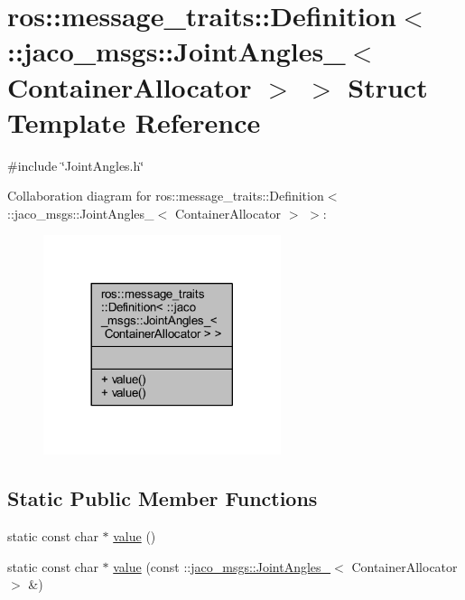 \hypertarget{structros_1_1message__traits_1_1Definition_3_01_1_1jaco__msgs_1_1JointAngles___3_01ContainerAllocator_01_4_01_4}{}\section{ros\+:\+:message\+\_\+traits\+:\+:Definition$<$ \+:\+:jaco\+\_\+msgs\+:\+:Joint\+Angles\+\_\+$<$ Container\+Allocator $>$ $>$ Struct Template Reference}
\label{structros_1_1message__traits_1_1Definition_3_01_1_1jaco__msgs_1_1JointAngles___3_01ContainerAllocator_01_4_01_4}


{\ttfamily \#include \char`\"{}Joint\+Angles.\+h\char`\"{}}



Collaboration diagram for ros\+:\+:message\+\_\+traits\+:\+:Definition$<$ \+:\+:jaco\+\_\+msgs\+:\+:Joint\+Angles\+\_\+$<$ Container\+Allocator $>$ $>$\+:
\nopagebreak
\begin{figure}[H]
\begin{center}
\leavevmode
\includegraphics[width=197pt]{d4/dd9/structros_1_1message__traits_1_1Definition_3_01_1_1jaco__msgs_1_1JointAngles___3_01ContainerAllocator_01_4_01_4__coll__graph}
\end{center}
\end{figure}
\subsection*{Static Public Member Functions}
\begin{DoxyCompactItemize}
\item 
static const char $\ast$ \hyperlink{structros_1_1message__traits_1_1Definition_3_01_1_1jaco__msgs_1_1JointAngles___3_01ContainerAllocator_01_4_01_4_ad1e421bdb7010be769409124216a760d}{value} ()
\item 
static const char $\ast$ \hyperlink{structros_1_1message__traits_1_1Definition_3_01_1_1jaco__msgs_1_1JointAngles___3_01ContainerAllocator_01_4_01_4_a367a6254ee6673cb082dbe3070536d04}{value} (const \+::\hyperlink{structjaco__msgs_1_1JointAngles__}{jaco\+\_\+msgs\+::\+Joint\+Angles\+\_\+}$<$ Container\+Allocator $>$ \&)
\end{DoxyCompactItemize}


